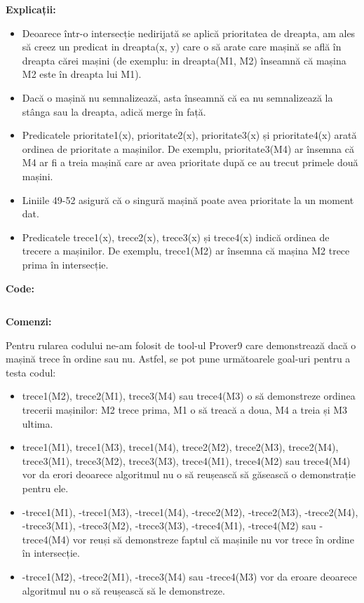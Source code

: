 \textbf{ Explicații:}

  \begin{itemize}
    \setlength\itemsep{0em}
    \item 	Deoarece într-o intersecție nedirijată se aplică prioritatea de dreapta, am ales să creez un predicat in dreapta(x, y) care o să arate care mașină se află în dreapta cărei mașini (de exemplu: in dreapta(M1, M2) înseamnă că mașina M2 este în dreapta lui M1).
    \item 	Dacă o mașină nu semnalizează, asta înseamnă că ea nu semnalizează la stânga sau la dreapta, adică merge în față.
    \item 	Predicatele prioritate1(x), prioritate2(x), prioritate3(x) și prioritate4(x) arată ordinea de prioritate a mașinilor. De exemplu, prioritate3(M4) ar însemna că M4 ar fi a treia mașină care ar avea prioritate după ce au trecut primele două mașini.
    \item Liniile 49-52 asigură că o singură mașină poate avea prioritate la un moment dat.
    \item Predicatele trece1(x), trece2(x), trece3(x) și trece4(x) indică ordinea de trecere a mașinilor. De exemplu, trece1(M2) ar însemna că mașina M2 trece prima în intersecție.
\end{itemize}



\textbf{Code:}

    \inputminted[linenos]{C}{cod/aut.in}



    
\textbf{Comenzi:}

Pentru rularea codului ne-am folosit de tool-ul Prover9 care demonstrează dacă o mașină trece în ordine sau nu. Astfel, se pot pune următoarele goal-uri pentru a testa codul:


 \begin{itemize}
    \setlength\itemsep{0em}
    \item trece1(M2), trece2(M1), trece3(M4) sau trece4(M3) o să demonstreze ordinea trecerii mașinilor: M2 trece prima, M1 o să treacă a doua, M4 a treia și M3 ultima.
    \item trece1(M1), trece1(M3), trece1(M4), trece2(M2), trece2(M3), trece2(M4), trece3(M1), trece3(M2), trece3(M3), trece4(M1), trece4(M2) sau trece4(M4) vor da erori deoarece algoritmul nu o să reușească să găsească o demonstrație pentru ele.
    \item -trece1(M1), -trece1(M3), -trece1(M4), -trece2(M2), -trece2(M3), -trece2(M4), -trece3(M1), -trece3(M2), -trece3(M3), -trece4(M1), -trece4(M2) sau -trece4(M4) vor reuși să demonstreze faptul că mașinile nu vor trece în ordine în intersecție.
    \item -trece1(M2), -trece2(M1), -trece3(M4) sau -trece4(M3) vor da eroare deoarece algoritmul nu o să reușească să le demonstreze.

\end{itemize}


